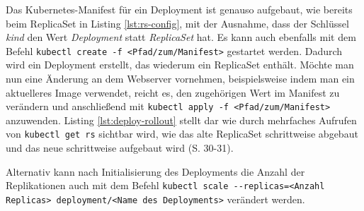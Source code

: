 \documentclass[11pt,a4paper]{article}
\begin{document}
Das Kubernetes-Manifest für ein Deployment ist genauso aufgebaut, wie bereits beim ReplicaSet in
Listing \ref{lst:rs-config}, mit der Ausnahme, dass der Schlüssel \emph{kind} den Wert
\emph{Deployment} statt \emph{ReplicaSet} hat. Es kann auch ebenfalls mit dem Befehl
\lstinline|kubectl create -f <Pfad/zum/Manifest>| gestartet werden.
Dadurch wird ein Deployment erstellt, das wiederum ein ReplicaSet enthält.
Möchte man nun eine Änderung an dem Webserver vornehmen, beispielsweise indem
man ein aktuelleres Image verwendet, reicht es, den zugehörigen Wert im Manifest
zu verändern und anschließend mit \lstinline|kubectl apply -f <Pfad/zum/Manifest>| anzuwenden.
Listing \ref{lst:deploy-rollout} stellt dar wie durch mehrfaches Aufrufen
von \lstinline|kubectl get rs| sichtbar wird, wie das alte
ReplicaSet schrittweise abgebaut und das neue schrittweise aufgebaut wird \cite{Schmeling_Dargatz_2022} (S. 30-31).

Alternativ kann nach Initialisierung des Deployments die Anzahl der Replikationen auch mit
dem Befehl \lstinline|kubectl scale --replicas=<Anzahl Replicas> deployment/<Name des Deployments>|
verändert werden.



\end{document}
